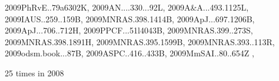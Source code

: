 \documentclass[12pt]{article}
\begin{document}
\begin{description}
{2009PhRvE..79a6302K,%
2009AN....330...92L,%
2009A&A...493.1125L,%
2009IAUS..259..159B,%
2009MNRAS.398.1414B,%
2009ApJ...697.1206B,%
2009ApJ...706..712H,%
2009PPCF...51l4043B,%
2009MNRAS.399..273S,%
2009MNRAS.398.1891H,%
2009MNRAS.395.1599B,%
2009MNRAS.393..113R,%
2009odsm.book...87B,%
2009ASPC..416..433B,%
2009MmSAI..80..654Z%
},\item
25 times in 2008 \citep{
2008A&A...491L..41L,%
2008ApJ...687L..49B,%
2008A&A...490..743G,%
2008A&A...490..501J,%
2008arXiv0809.4949G,%
2008ApJ...685..406W,%
2008A&A...488....9K,%
2008A&A...486..597J,%
}
\end{description}
\end{document}
